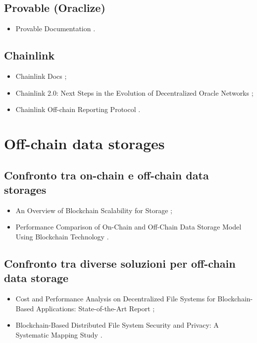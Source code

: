 \subsection*{Provable (Oraclize)}
\begin{itemize}

\item Provable Documentation \cite{provable2024doc}.

\end{itemize}

\subsection*{Chainlink}
\begin{itemize}

\item Chainlink Docs \cite{chainlink2024doc};

\item Chainlink 2.0: Next Steps in the Evolution of Decentralized Oracle Networks \cite{chainlink2021whitepaper};

\item Chainlink Off-chain Reporting Protocol \cite{chainlink2021protocol}.

\end{itemize}

\section*{Off-chain data storages}

\subsection*{Confronto tra on-chain e off-chain data storages}
\begin{itemize}

\item An Overview of Blockchain Scalability for Storage \cite{gong2023onoffchain};

\item Performance Comparison of On-Chain and Off-Chain Data Storage Model Using Blockchain Technology \cite{priya2023onoffchain}.

\end{itemize}

\subsection*{Confronto tra diverse soluzioni per off-chain data storage}
\begin{itemize}

\item Cost and Performance Analysis on Decentralized File Systems for Blockchain-Based Applications: State-of-the-Art Report \cite{ismail2022offchain};

\item Blockchain-Based Distributed File System Security and Privacy: A Systematic Mapping Study \cite{mohtar2022offchain}.

\end{itemize}

